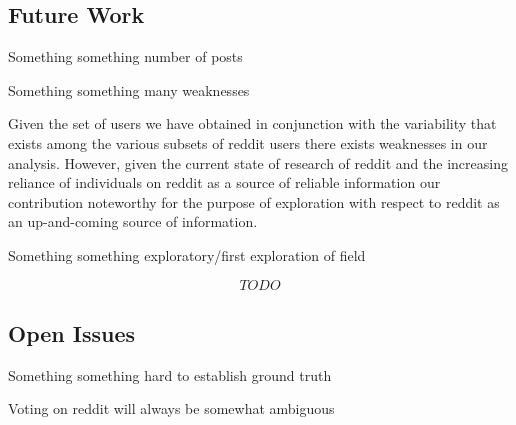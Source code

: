 \lipsum[1]

\subsection{Future Work} %
\label{sub:future_work}

Something something number of posts

Something something many weaknesses

Given the set of users we have obtained in conjunction with the variability that
exists among the various subsets of reddit users there exists weaknesses in our
analysis. However, given the current state of research of reddit and the
increasing reliance of individuals on reddit as a source of reliable information
our contribution noteworthy for the purpose of exploration with respect to
reddit as an up-and-coming source of information.

Something something exploratory/first exploration of field

\[TODO\]



\subsection{Open Issues} %
\label{sub:open_issues}

Something something hard to establish ground truth

Voting on reddit will always be somewhat ambiguous

